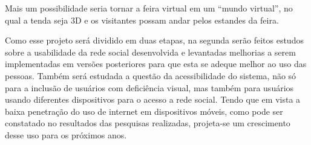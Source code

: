 Mais um possibilidade seria tornar a feira virtual em um “mundo virtual”, no qual a tenda seja 3D e os visitantes possam andar pelos estandes da feira.

Como esse projeto será dividido em duas etapas, na segunda serão feitos estudos sobre a usabilidade da rede social desenvolvida e levantadas melhorias a serem implementadas em versões posteriores para que esta se adeque melhor ao uso das pessoas. Também será estudada a questão da acessibilidade do sistema, não só para a inclusão de usuários com deficiência visual, mas também para usuários usando diferentes dispositivos para o acesso a rede social. Tendo que em vista a baixa penetração do uso de internet em dispositivos móveis, como pode ser constatado no resultados das pesquisas realizadas, projeta-se um crescimento desse uso para os próximos anos.



